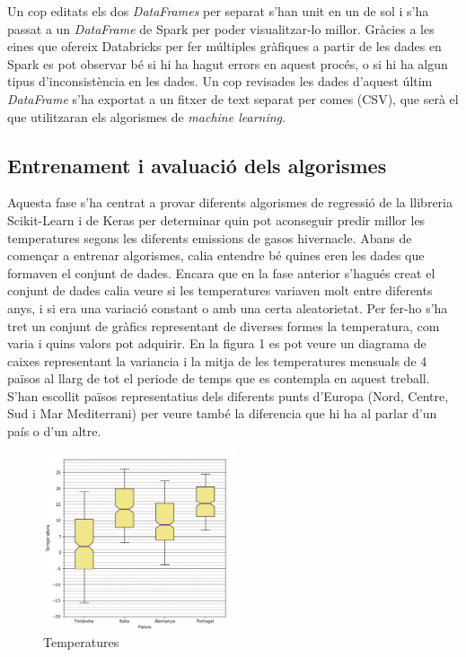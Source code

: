 \documentclass[10pt,a4paper,twocolumn,twoside]{article}
\begin{document}
Un cop editats els dos \textit{DataFrames} per separat s'han unit en un de sol i s'ha passat a un \textit{DataFrame} de Spark per poder visualitzar-lo millor. Gràcies a les eines que ofereix Databricks per fer múltiples gràfiques a partir de les dades en Spark es pot observar bé si hi ha hagut errors en aquest procés, o si hi ha algun tipus d'inconsistència en les dades. Un cop revisades les dades d'aquest últim \textit{DataFrame} s'ha exportat a un fitxer de text separat per comes (CSV), que serà el que utilitzaran els algorismes de \textit{machine learning}.
\subsection{Entrenament i avaluació dels algorismes}
Aquesta fase s'ha centrat a provar diferents algorismes de regressió de la llibreria Scikit-Learn i de Keras per determinar quin pot aconseguir predir millor les temperatures segons les diferents emissions de gasos hivernacle. Abans de començar a entrenar algorismes, calia entendre bé quines eren les dades que formaven el conjunt de dades. Encara que en la fase anterior s'hagués creat el conjunt de dades calia veure si les temperatures variaven molt entre diferents anys, i si era una variació constant o amb una certa aleatorietat. Per fer-ho s'ha tret un conjunt de gràfics representant de diverses formes la temperatura, com varia i quins valors pot adquirir. En la figura 1 es pot veure un diagrama de caixes representant la variancia i la mitja de les temperatures mensuals de 4 països al llarg de tot el periode de temps que es contempla en aquest treball. S'han escollit països representatius dels diferents punts d'Europa (Nord, Centre, Sud i Mar Mediterrani) per veure també la diferencia que hi ha al parlar d'un país o d'un altre.
\begin{figure}[!h]
\centering
	\includegraphics[width=0.5\textwidth]{../img/tempMitjaVariacioPaisos}
	\caption{Temperatures }
	\label{fig-tempMitjaPaisos}
\end{figure}
\end{document}
